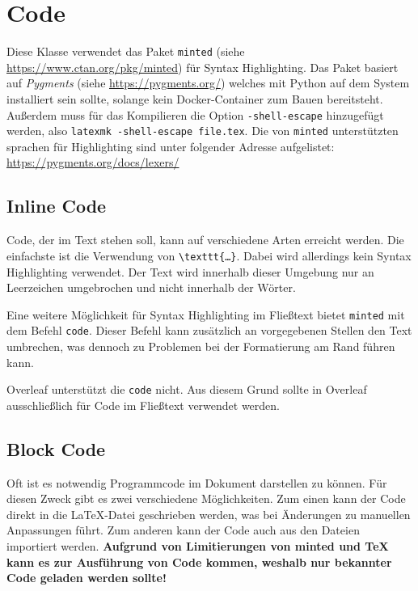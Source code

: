 \chapter{Code}
Diese Klasse verwendet das Paket \texttt{minted} (siehe \url{https://www.ctan.org/pkg/minted}) für Syntax Highlighting. Das Paket basiert auf \textit{Pygments} (siehe \url{https://pygments.org/}) welches mit Python auf dem System installiert sein sollte, solange kein Docker-Container zum Bauen bereitsteht. Außerdem muss für das Kompilieren die Option \texttt{-shell-escape} hinzugefügt werden, also \texttt{latexmk -shell-escape file.tex}. Die von \texttt{minted} unterstützten sprachen für Highlighting sind unter folgender Adresse aufgelistet: \url{https://pygments.org/docs/lexers/}

\section{Inline Code}
Code, der im Text stehen soll, kann auf verschiedene Arten erreicht werden. Die einfachste ist die Verwendung von \texttt{\textbackslash{}texttt\{…\}}. Dabei wird allerdings kein Syntax Highlighting verwendet. Der Text wird innerhalb dieser Umgebung nur an Leerzeichen umgebrochen und nicht innerhalb der Wörter.

Eine weitere Möglichkeit für Syntax Highlighting im Fließtext bietet \texttt{minted} mit dem Befehl \texttt{\texttt{code}}. Dieser Befehl kann zusätzlich an vorgegebenen Stellen den Text umbrechen, was dennoch zu Problemen bei der Formatierung am Rand führen kann.

\begin{information}
    Overleaf unterstützt die \texttt{\texttt{code}} nicht. Aus diesem Grund sollte in Overleaf ausschließlich \texttt{\texttt{}} für Code im Fließtext verwendet werden.
\end{information}

\section{Block Code}
Oft ist es notwendig Programmcode im Dokument darstellen zu können. Für diesen Zweck gibt es zwei verschiedene Möglichkeiten. Zum einen kann der Code direkt in die \LaTeX-Datei geschrieben werden, was bei Änderungen zu manuellen Anpassungen führt. Zum anderen kann der Code auch aus den Dateien importiert werden. \textbf{Aufgrund von Limitierungen von minted und TeX kann es zur Ausführung von Code kommen, weshalb nur bekannter Code geladen werden sollte!}

